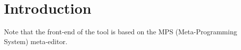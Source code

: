 \section{Introduction}

Note that the front-end of the tool is based on the MPS
(Meta-Programming System) meta-editor.

